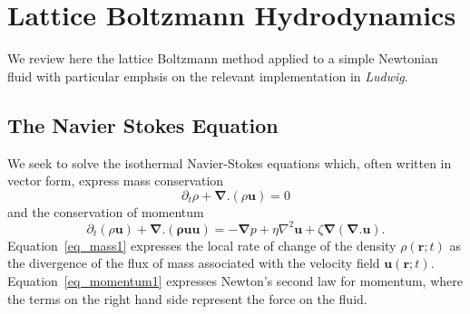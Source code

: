 
\section{Lattice Boltzmann Hydrodynamics}
\label{section:lb-hydrodynamics}

We review here the lattice Boltzmann method applied to a simple
Newtonian fluid with particular emphsis on the relevant
implementation in \textit{Ludwig}.

\subsection{The Navier Stokes Equation}

We seek to solve the isothermal Navier-Stokes equations which, often
written in vector form, express mass conservation
\begin{equation}
\partial_t \rho + \boldsymbol{\nabla}.(\rho\mathbf{u}) = 0
\label{eq_mass1}
\end{equation}
and the conservation of momentum
\begin{equation}
\partial_t (\rho\mathbf{u}) + \boldsymbol{\nabla}.(\mathbf{\rho uu}) =
-\boldsymbol{\nabla}p + \eta \nabla^2 \mathbf{u}
+\zeta \boldsymbol{\nabla}(\boldsymbol{\nabla}.\mathbf{u}).
\label{eq_momentum1}
\end{equation}
Equation~\ref{eq_mass1} expresses the local rate of change of the
density $\rho(\mathbf{r}; t)$ as the divergence of the flux of
mass associated with the velocity field $\mathbf{u}(\mathbf{r}; t)$.
Equation~\ref{eq_momentum1} expresses Newton's second law for
momentum, where the terms on the right hand side represent the
force on the fluid.

